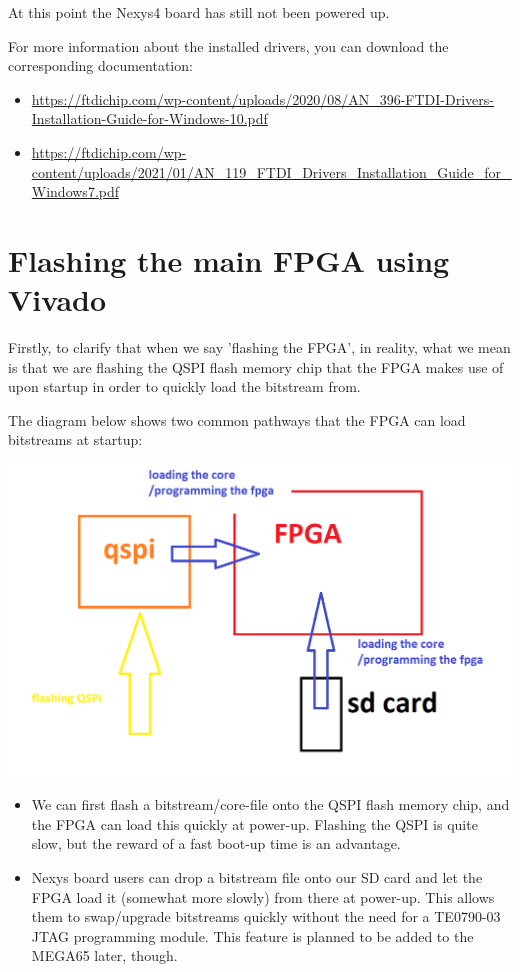 At this point the Nexys4 board has still not been powered up.

For more information about the installed drivers, you can download the corresponding documentation:

\begin{itemize}
  \item \url{https://ftdichip.com/wp-content/uploads/2020/08/AN\_396-FTDI-Drivers-Installation-Guide-for-Windows-10.pdf}
  \item \url{https://ftdichip.com/wp-content/uploads/2021/01/AN\_119\_FTDI\_Drivers\_Installation\_Guide\_for\_Windows7.pdf}
\end{itemize}

\section{Flashing the main FPGA using Vivado}
\label{sec:mainfpgaflashing}

Firstly, to clarify that when we say 'flashing the FPGA', in reality, what we mean is that we are flashing the QSPI flash memory chip that the FPGA makes use of upon startup in order to quickly load the bitstream from.

The diagram below shows two common pathways that the FPGA can load bitstreams at startup:

\begin{center}
\includegraphics[width=0.8\linewidth]{images/flashing_fpga.png}
\end{center}

\begin{itemize}
  \item We can first flash a bitstream/core-file onto the QSPI flash memory chip, and the FPGA can load this quickly at power-up. Flashing the QSPI is quite slow, but the reward of a fast boot-up time is an advantage.
  \item Nexys board users can drop a bitstream file onto our SD card and let the FPGA load it (somewhat more slowly) from there at power-up. This allows them to swap/upgrade bitstreams quickly without the need for a TE0790-03 JTAG programming module. This feature is planned to be added to the MEGA65 later, though.
\end{itemize}

